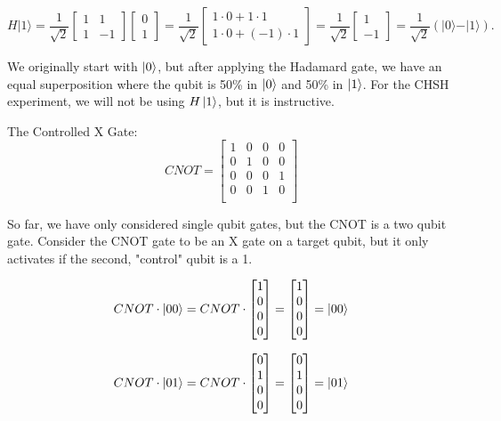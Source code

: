 \documentclass[12pt]{article}
\begin{document}
$$
H \vert 1 \rangle = 
\frac{1}{\sqrt{2}} \begin{bmatrix} 1 & 1 \\ 1 & -1 \end{bmatrix}
\begin{bmatrix} 0 \\ 1 \end{bmatrix}
=
\frac{1}{\sqrt{2}} \begin{bmatrix} 1\cdot0 + 1\cdot1 \\ 1\cdot0 + (-1)\cdot1 \end{bmatrix}
=
\frac{1}{\sqrt{2}} \begin{bmatrix} 1 \\ -1 \end{bmatrix}
=
\frac{1}{\sqrt{2}} \left( \vert 0 \rangle - \vert 1 \rangle \right).
$$

We originally start with $\ket{0}$, but after applying the Hadamard gate, we have an equal superposition where the qubit is 50\% in $\ket{0}$ and 50\% in $\ket{1}$. For the CHSH experiment, we will not be using $H\ket{1}$, but it is instructive. %


The Controlled X Gate:
$$
CNOT =
\begin{bmatrix}
1 &  0  &  0  & 0 \\
0 &  1  &  0  & 0 \\
0 &  0  &  0  & 1 \\
0 &  0  &  1  & 0 \\
\end{bmatrix}
$$

So far, we have only considered single qubit gates, but the CNOT is a two qubit gate. Consider the CNOT gate to be an X gate on a target qubit, but it only activates if the second, "control" qubit is a 1.


$$
CNOT \cdot \ket{00} =
CNOT \cdot
\begin{bmatrix} 1 \\ 0 \\ 0 \\ 0 \end{bmatrix}
=
\begin{bmatrix} 1 \\ 0 \\ 0 \\ 0 \end{bmatrix} = \ket{00}
$$

$$
CNOT \cdot \ket{01} =
CNOT \cdot
\begin{bmatrix} 0 \\ 1 \\ 0 \\ 0 \end{bmatrix}
=
\begin{bmatrix} 0 \\ 1 \\ 0 \\ 0 \end{bmatrix} = \ket{01}
$$
\end{document}
